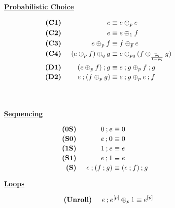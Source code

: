 \begin{figure*}
        \centering
        \begin{multicols}{2}
        	 \begin{flushleft}\underline{\bf Probabilistic Choice}  	 \end{flushleft}
        \begin{alignat*}{4}
		\textbf{(C1)} & \;\, 
		& e &{} \equiv e \oplus_p e\\
				\textbf{(C2)} & \;\, 
		& e &{} \equiv e \oplus_1 f\\
		\textbf{(C3)} & \;\, 
		& e \oplus_p  f &{} \equiv f \oplus_{\overline{p}} e\\
		\textbf{(C4)} & \;\, 
		& (e \oplus_{p} f) \oplus_{q} g & {} \equiv e \oplus_{pq} (f \oplus_{\frac{\overline{p}q}{1-pq}} g)\\
		\textbf{(D1)} & \;\, 
		& (e \oplus_{p} f) \seq g & {} \equiv e \seq g \oplus_{p} f \seq g\\[-0.25ex]
		\textbf{(D2)} & \;\, 
		& e \seq (f \oplus_{p} g) & {} \equiv e \seq g \oplus_{p} e \seq f\\[-0.25ex]\\\\
        \end{alignat*}
          \begin{flushleft}   \underline{\bf Sequencing} \end{flushleft}
        \begin{alignat*}{4}
        \textbf{(0S)} & \;\, 
		& 0 \seq e & {} \equiv 0 & \\[-0.25ex]
		\textbf{(S0)} & \;\, 
		& e \seq 0 & {} \equiv 0 & \\[-0.25ex]
		\textbf{(1S)} & \;\, 
		& 1 \seq e & {} \equiv e & \\[-0.25ex]
		\textbf{(S1)} & \;\, 
		& e \seq 1 & {} \equiv e \\[-0.25ex]
		\textbf{(S)} & \;\, 
		& e \seq (f \seq g) & {} \equiv (e \seq f ) \seq g \\[-0.25ex]
        \end{alignat*}
        \end{multicols}
        \vspace{-2cm}
         \begin{multicols}{2}
     \begin{flushleft}    \underline{\bf Loops} \end{flushleft}
        \begin{alignat*}{4}
       	\textbf{(Unroll)} & \;\, 
		& e \seq e^{[p]} \oplus_p 1& {} \equiv e^{[p]} \\

\end{alignat*}
\end{multicols}
\end{figure*}
